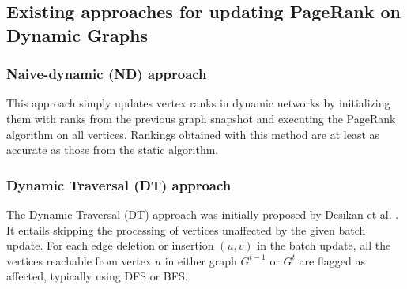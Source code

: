 \subsection{Existing approaches for updating PageRank on Dynamic Graphs}

\subsubsection{Naive-dynamic (ND) approach}
\label{sec:about-naive}

This approach simply updates vertex ranks in dynamic networks by initializing them with ranks from the previous graph snapshot and executing the PageRank algorithm on all vertices. Rankings obtained with this method are at least as accurate as those from the static algorithm.


\subsubsection{Dynamic Traversal (DT) approach}
\label{sec:about-traversal}

The Dynamic Traversal (DT) approach was initially proposed by Desikan et al. \cite{rank-desikan05}. It entails skipping the processing of vertices unaffected by the given batch update. For each edge deletion or insertion $(u, v)$ in the batch update, all the vertices reachable from vertex $u$ in either graph $G^{t-1}$ or $G^t$ are flagged as affected, typically using DFS or BFS.
